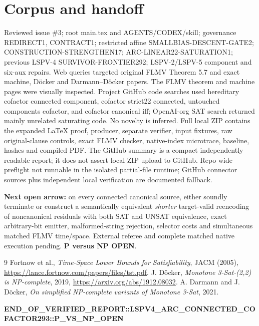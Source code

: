 \documentclass[10pt]{article}
\begin{document}
\section{Corpus and handoff}
Reviewed issue \#3; root main.tex and AGENTS/CODEX/skill; governance REDIRECT1, CONTRACT1; restricted affine SMALLBIAS-DESCENT-GATE2; CONSTRUCTION-STRENGTHEN17; ARC-LINEAR22-SATURATION1; previous LSPV-4 SURVIVOR-FRONTIER292; LSPV-2/LSPV-5 component and six-aux repairs. Web queries targeted original FLMV Theorem 5.7 and exact machine, D\"ocker and Darmann--D\"ocker papers. The FLMV theorem and machine pages were visually inspected. Project GitHub code searches used hereditary cofactor connected component, cofactor strict22 connected, untouched components cofactor, and cofactor canonical iff; OpenAI-org SAT search returned mainly unrelated saturating code. No novelty is inferred. Full local ZIP contains the expanded LaTeX proof, producer, separate verifier, input fixtures, raw original-clause controls, exact FLMV checker, native-index microtrace, baseline, hashes and compiled PDF. The GitHub summary is a compact independently readable report; it does not assert local ZIP upload to GitHub. Repo-wide preflight not runnable in the isolated partial-file runtime; GitHub connector sources plus independent local verification are documented fallback.
\par\noindent \textbf{Next open arrow:} on every connected canonical source, either soundly terminate or construct a semantically equivalent \emph{shorter} target-valid reencoding of noncanonical residuals with both SAT and UNSAT equivalence, exact arbitrary-bit emitter, malformed-string rejection, selector costs and simultaneous matched FLMV time/space. External referee and complete matched native execution pending. \textbf{P versus NP OPEN}.
\begin{thebibliography}{9}
 Fortnow et al., \emph{Time-Space Lower Bounds for Satisfiability}, JACM (2005), \url{https://lance.fortnow.com/papers/files/tst.pdf}.
 J. D\"ocker, \emph{Monotone 3-Sat-(2,2) is NP-complete}, 2019, \url{https://arxiv.org/abs/1912.08032}.
 A. Darmann and J. D\"ocker, \emph{On simplified NP-complete variants of Monotone 3-Sat}, 2021.
\end{thebibliography}
\noindent\textbf{END\_OF\_VERIFIED\_REPORT::LSPV4\_ARC\_CONNECTED\_COFACTOR293::P\_VS\_NP\_OPEN}
\end{document}
